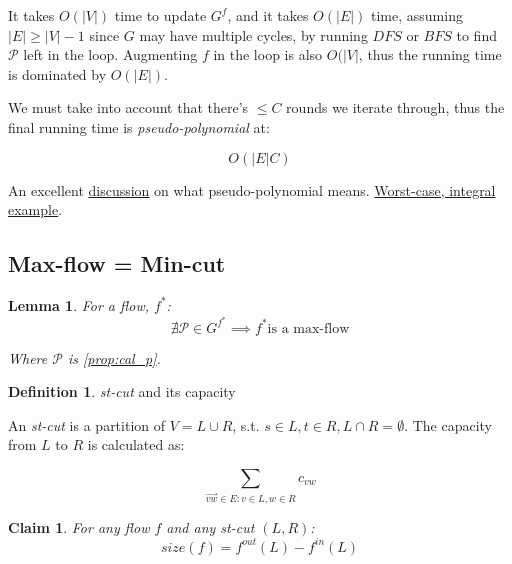 \documentclass{article}
\newtheorem{claim}[theorem]{Claim}
\newtheorem{lemma}[theorem]{Lemma}
\theoremstyle{definition}
\newtheorem{definition}{Definition}[section]
\begin{document}
It takes $O(|V|)$ time to update $G^f$, and it takes $O(|E|)$ time, assuming $|E| \geq |V|-1$ since $G$ may have multiple cycles, by running $DFS$ or $BFS$ to find $\mathcal{P}$ left in the loop. Augmenting $f$ in the loop is also $O(|V|$, thus the running time is dominated by $O(|E|)$. 

We must take into account that there's $\leq C$ rounds we iterate through, thus the final running time is \textit{pseudo-polynomial} at:

$$O(|E|C)$$

An excellent \href{https://stackoverflow.com/questions/19649026/is-network-flow-pseudo-polynomial-time}{discussion} on what pseudo-polynomial means. \href{https://en.wikipedia.org/wiki/Ford%E2%80%93Fulkerson_algorithm#Integral_example}{Worst-case, integral example}.

\subsection{Max-flow = Min-cut}
\begin{lemma}
\label{lem:aug_path}
For a flow, $f^*$: $$\nexists \mathcal{P} \in G^{f^*} \implies f^* \text{is a max-flow}$$
	
Where $\mathcal{P}$ is \ref{prop:cal_p}.
\end{lemma}

\begin{definition}{\textit{st-cut} and its capacity}
\label{def:st_cut_cap}

An \textit{st-cut} is a partition of $V = L \cup R$, s.t. $s \in L, t \in R, L \cap R = \emptyset$. The capacity from $L$ to $R$ is calculated as:

$$\sum_{\overrightarrow{vw} \in E : v \in L, w \in R} c_{vw}$$
\end{definition}

\begin{claim}
\label{clm:in_out_flow}
For any flow $f$ and any st-cut $(L,R)$:
$$size(f) = f^{out} (L) - f^{in} (L)$$
\end{claim}
\end{document}
